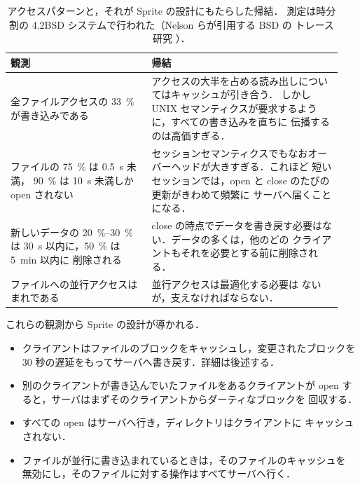 \documentclass[../main.tex]{subfiles}
\begin{document}
\begin{table}[htbp]
  \centering
  \caption{アクセスパターンと，それが Sprite の設計にもたらした帰結．
    測定は時分割の 4.2BSD システムで行われた（Nelson らが引用する BSD の
    トレース研究 \cite{ousterhout1985}）．}
  \label{tab:l14-sprite-analysis}
  \small
  \begin{tabular}{@{}>{\raggedright\arraybackslash}p{0.4\linewidth}>{\raggedright\arraybackslash}p{0.54\linewidth}@{}}
    \toprule
    観測 & 帰結 \\
    \midrule
    全ファイルアクセスの \SI{33}{\percent} が書き込みである &
      アクセスの大半を占める読み出しについてはキャッシュが引き合う．
      しかし UNIX セマンティクスが要求するように，すべての書き込みを直ちに
      伝播するのは高価すぎる． \\
    ファイルの \SI{75}{\percent} は \SI{0.5}{\second} 未満，
      \SI{90}{\percent} は \SI{10}{\second} 未満しか open されない &
      セッションセマンティクスでもなおオーバーヘッドが大きすぎる．これほど
      短いセッションでは，open と close のたびの更新がきわめて頻繁に
      サーバへ届くことになる． \\
    新しいデータの
      \SIrange[range-phrase={--},range-units=single]{20}{30}{\percent} は
      \SI{30}{\second} 以内に，\SI{50}{\percent} は \SI{5}{\minute} 以内に
      削除される &
      close の時点でデータを書き戻す必要はない．データの多くは，他のどの
      クライアントもそれを必要とする前に削除される． \\
    ファイルへの並行アクセスはまれである & 並行アクセスは最適化する必要は
      ないが，支えなければならない． \\
    \bottomrule
  \end{tabular}
\end{table}

これらの観測から Sprite の設計が導かれる．
\begin{itemize}
  \item クライアントはファイルのブロックをキャッシュし，変更されたブロックを
    30 秒の遅延をもってサーバへ書き戻す．詳細は後述する．
  \item 別のクライアントが書き込んでいたファイルをあるクライアントが
    open すると，サーバはまずそのクライアントからダーティなブロックを
    回収する．
  \item すべての open はサーバへ行き，ディレクトリはクライアントに
    キャッシュされない．
  \item ファイルが並行に書き込まれているときは，そのファイルのキャッシュを
    無効にし，そのファイルに対する操作はすべてサーバへ行く．
\end{itemize}
\end{document}
